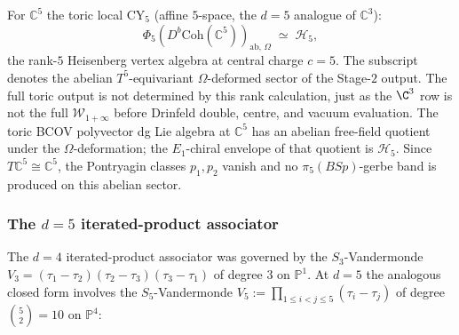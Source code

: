 \begin{conjecture}
\label{conj:cy5-phi-5-output-identification-c5}
\ClaimStatusConjectured
{}%
For $\mathbb{C}^5$ the toric local CY${}_5$ \textup{(}affine $5$-space, the
$d = 5$ analogue of $\mathbb{C}^3$\textup{):}
\[
 \Phi_5(D^b\mathrm{Coh}(\mathbb{C}^5))_{\mathrm{ab},\,\Omega}
 \;\simeq\; \mathcal{H}_5,
\]
the rank-$5$ Heisenberg vertex algebra at central charge \(c=5\).
The subscript denotes the abelian \(T^5\)-equivariant
\(\Omega\)-deformed sector of the Stage-$2$ output. The full toric
output is not determined by this rank calculation, just as the
\(\C^3\) row is not the full \(\mathcal W_{1+\infty}\) before
Drinfeld double, centre, and vacuum evaluation. The toric BCOV
polyvector dg Lie algebra at \(\mathbb C^5\) has an abelian free-field
quotient under the \(\Omega\)-deformation; the \(E_1\)-chiral envelope
of that quotient is \(\mathcal H_5\). Since
\(T\mathbb C^5\cong\mathbb C^5\), the Pontryagin classes \(p_1,p_2\)
vanish and no \(\pi_5(BSp)\)-gerbe band is produced on this abelian
sector.
\end{conjecture}

\subsubsection{The \texorpdfstring{$d=5$}{d=5} iterated-product associator}
\label{subsubsec:phi-5-associator}

The $d = 4$ iterated-product associator was governed by the $S_3$-Vandermonde
$V_3 = (\tau_1 - \tau_2)(\tau_2 - \tau_3)(\tau_3 - \tau_1)$ of degree $3$ on
$\mathbb{P}^1$. At $d = 5$ the analogous closed form involves the $S_5$-Vandermonde
$V_5 := \prod_{1 \le i < j \le 5}(\tau_i - \tau_j)$ of degree $\binom{5}{2} = 10$
on $\mathbb{P}^4$:

